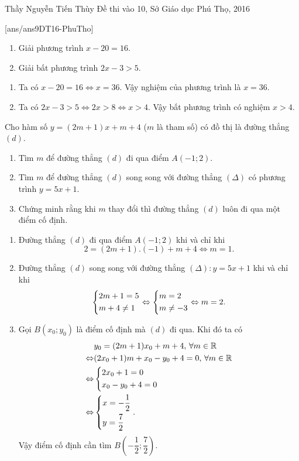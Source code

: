 \begin{name}
{Thầy  Nguyễn Tiến Thùy}
{Đề thi vào 10, Sở Giáo dục Phú Thọ, 2016}
\end{name}
\setcounter{ex}{0}
[ans/ans9DT16-PhuTho]
\begin{ex}%
\hfill
    \begin{enumerate}
        \item Giải phương trình $x-20=16$. 
        \item Giải bất phương trình $2x-3>5$.
    \end{enumerate}
\loigiai
    {
    \begin{enumerate}
        \item Ta có $x-20=16\Leftrightarrow x=36$. Vậy nghiệm của phương trình là $x=36$.        	 	 
        \item Ta có $2x-3>5\Leftrightarrow 2x>8\Leftrightarrow x>4$. Vậy bất phương trình có nghiệm $x>4$.
    \end{enumerate}
    }
\end{ex}

\begin{ex}%
Cho hàm số $y=(2m+1)x+m+4$ ($m$ là tham số) có đồ thị là đường thẳng $(d)$.
    \begin{enumerate}       
        \item Tìm $m$ để đường thẳng $(d)$ đi qua điểm $A(-1;2)$.
        \item Tìm $m$ để đường thẳng $(d)$ song song với đường thẳng $(\Delta)$ có phương trình $y=5x+1$.
        \item Chứng minh rằng khi $m$ thay đổi thì đường thẳng $(d)$ luôn đi qua một điểm cố định. 
    \end{enumerate}
\loigiai
    {
    \begin{enumerate}
        \item Đường thẳng $(d)$ đi qua điểm $A(-1;2)$ khi và chỉ khi
        $$2=(2m+1).(-1)+m+4\Leftrightarrow m=1.$$ 
        \item Đường thẳng $(d)$ song song với đường thẳng $(\Delta): y=5x+1$ khi và chỉ khi
        $$\left\{\begin{aligned}&2m+1=5\\ &m+4\ne 1\end{aligned}\right.\Leftrightarrow \left\{\begin{aligned}&m=2 \\ &m\ne -3\end{aligned}\right.\Leftrightarrow m=2.$$
        \item Gọi $B(x_0;y_0)$ là điểm cố định mà $(d)$ đi qua. Khi đó ta có
        \begin{align*}
        &y_0=(2m+1)x_0+m+4,\, \forall m\in \mathbb{R} \\
        \Leftrightarrow &(2x_0+1)m+x_0-y_0+4=0,\, \forall m\in \mathbb{R} \\
        \Leftrightarrow &\left\{\begin{aligned}&2x_0+1=0 \\ &x_0-y_0+4=0\end{aligned}\right. \\
        \Leftrightarrow &\left\{\begin{aligned}&x=-\dfrac{1}{2}\\&y=\dfrac{7}{2}\end{aligned}\right..
        \end{align*}
        Vậy điểm cố định cần tìm $B\left(-\dfrac{1}{2};\dfrac{7}{2}\right)$.
    \end{enumerate}
    }
\end{ex}

